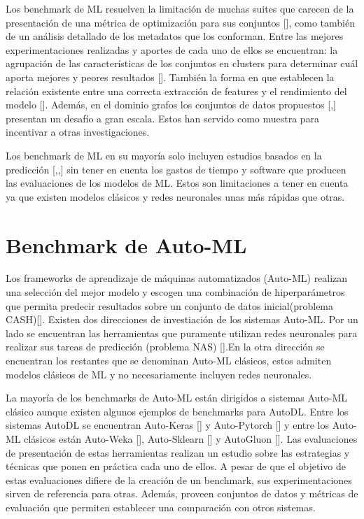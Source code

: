 Los benchmark de ML resuelven la limitación de muchas suites que carecen de la presentación de una métrica de optimización para sus conjuntos 
[\cite{44}], como también de un análisis detallado de los metadatos que los conforman. 
Entre las mejores experimentaciones realizadas y aportes de cada uno de ellos se encuentran: la agrupación de las características de los conjuntos 
en clusters para determinar cuál aporta mejores y peores resultados [\cite{2}]. También la forma en que establecen la relación existente entre una correcta 
extracción de features y el rendimiento del modelo [\cite{4}]. Además, en el dominio grafos los conjuntos de datos propuestos [\cite{5},\cite{6}] presentan un desafío 
a gran escala. Estos han servido como muestra para incentivar a otras investigaciones.

Los benchmark de ML en su mayoría solo incluyen estudios basados en la predicción [\cite{4},\cite{3},\cite{2}] sin tener en cuenta los gastos de tiempo y software 
que producen las evaluaciones de los modelos de ML. Estos son limitaciones a tener en cuenta ya que existen modelos clásicos y redes neuronales unas más 
rápidas que otras.


\section{Benchmark de Auto-ML}\label{section:bench Auto-ML}

Los frameworks de aprendizaje de máquinas automatizados (Auto-ML) realizan una selección del mejor modelo y escogen una combinación de hiperparámetros que permita 
predecir resultados sobre un conjunto de datos inicial(problema CASH)[\cite{37}]. Existen dos direcciones de investiación de los sistemas Auto-ML.
Por un lado se encuentran las herramientas que puramente utilizan redes neuronales para realizar sus tareas de predicción (problema NAS) [\cite{35}].En la otra 
dirección se encuentran los restantes que se denominan Auto-ML clásicos, estos admiten modelos clásicos de ML y no necesariamente incluyen redes neuronales.

La mayoría de los benchmarks de Auto-ML están dirigidos a sistemas Auto-ML clásico aunque existen algunos ejemplos de benchmarks para AutoDL. 
Entre los sistemas AutoDL se encuentran Auto-Keras [\cite{13}] y Auto-Pytorch [\cite{21}] y entre los Auto-ML clásicos están Auto-Weka [\cite{8}], Auto-Sklearn [\cite{9}] y 
AutoGluon [\cite{17}]. Las evaluaciones de presentación de estas herramientas realizan un estudio sobre las estrategias y técnicas que ponen en práctica cada uno 
de ellos. A pesar de que el objetivo de estas evaluaciones difiere de la creación de un benchmark, sus experimentaciones sirven de referencia para otras. Además, 
proveen conjuntos de datos y métricas de evaluación que permiten establecer una comparación con otros sistemas.

